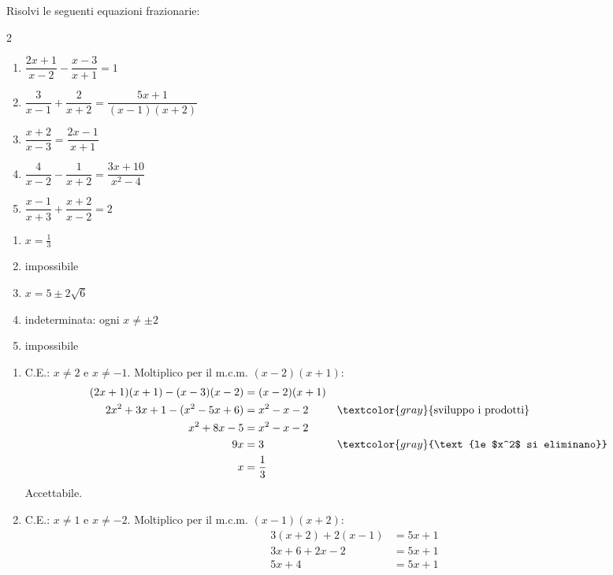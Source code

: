 \begin{question}[ID=3.5, subtitle={Equazioni frazionarie con più denominatori}, difficulty=difficile, tags={equazioni frazionarie}]
Risolvi le seguenti equazioni frazionarie:
\begin{multicols}{2}
\begin{enumerate}[leftmargin=3cm]
    \item $\dfrac{2x+1}{x-2} - \dfrac{x-3}{x+1} = 1$
    \item $\dfrac{3}{x-1} + \dfrac{2}{x+2} = \dfrac{5x+1}{(x-1)(x+2)}$
    \item $\dfrac{x+2}{x-3} = \dfrac{2x-1}{x+1}$
    \item $\dfrac{4}{x-2} - \dfrac{1}{x+2} = \dfrac{3x+10}{x^2-4}$
    \item $\dfrac{x-1}{x+3} + \dfrac{x+2}{x-2} = 2$
\end{enumerate}
\end{multicols}
\begin{solution}
\begin{enumerate}
    \item $x=\tfrac13$
    \item impossibile
    \item $x=5\pm2\sqrt6$
    \item indeterminata: ogni $x\neq\pm2$
    \item impossibile
\end{enumerate}
\end{solution}
\begin{explanation}
\begin{enumerate}
    \item C.E.: $x\neq2$ e $x\neq-1$. Moltiplico per il m.c.m. $(x-2)(x+1)$:
    \[\begin{aligned}
    (2x+1)(x+1)-(x-3)(x-2) &= (x-2)(x+1)\\
    2x^2+3x+1-(x^2-5x+6) &= x^2-x-2 && \textcolor{gray}{\text{sviluppo i prodotti}}\\
    x^2+8x-5 &= x^2-x-2\\
    9x &= 3 && \textcolor{gray}{\text{le $x^2$ si eliminano}}\\
    x &= \dfrac13
    \end{aligned}\]
    Accettabile.
    \item C.E.: $x\neq1$ e $x\neq-2$. Moltiplico per il m.c.m. $(x-1)(x+2)$:
    \[\begin{aligned}
    3(x+2)+2(x-1) &= 5x+1\\
    3x+6+2x-2 &= 5x+1\\
    5x+4 &= 5x+1\\

\end{aligned}\]
\end{enumerate}
\end{explanation}
\end{question}
